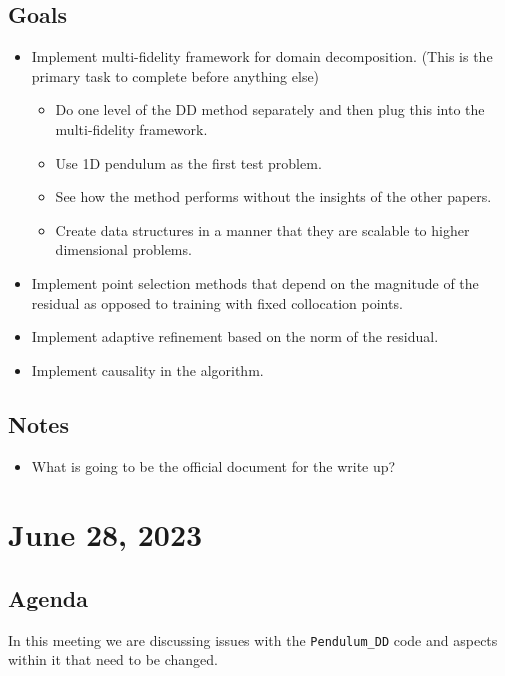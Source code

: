 \documentclass{article}
\begin{document}
\subsection*{Goals}
\begin{itemize}
\item Implement multi-fidelity framework for domain decomposition. (This is the primary task to complete before anything else)
\begin{itemize}
	\item Do one level of the DD method separately and then plug this into the multi-fidelity framework.
	\item Use 1D pendulum as the first test problem.
	\item See how the method performs without the insights of the other papers.
	\item Create data structures in a manner that they are scalable to higher dimensional problems.
\end{itemize}
\item Implement point selection methods that depend on the magnitude of the residual as opposed to training with fixed collocation points.
\item Implement adaptive refinement based on the norm of the residual.
\item Implement causality in the algorithm.
\end{itemize}
\subsection*{Notes}
\begin{itemize}
	\item What is going to be the official document for the write up?
\end{itemize}
\newpage
\section*{June 28, 2023}
\subsection*{Agenda}
In this meeting we are discussing issues with the \verb|Pendulum_DD| code and aspects within it that need to be changed.
\end{document}
